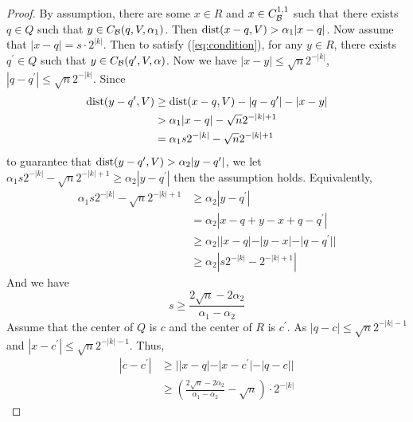 \begin{proof} 
    By assumption, there are some $x\in R$ and $x\in C_\mathcal B^{1, 1}$ such that there exists $q\in Q$ such that $y\in C_\mathcal B(q, V, \alpha_1)$. Then $\operatorname{dist}(x-q, V) > \alpha_1|x-q|$. Now assume that $|x-q| = s\cdot 2^{|k|}$. Then to satisfy (\ref{eq:condition}), for any $y\in R$, there exists $q^\prime\in Q$ such that $y\in C_\mathcal B(q^\prime, V, \alpha)$. Now we have $|x-y|\leq \sqrt{n}2^{-|k|}$, $|q-q^\prime|\leq \sqrt{n}2^{-|k|}$. Since
    \begin{equation*}
        \begin{split}
            \operatorname{dist}(y-q^\prime, V) &\geq \operatorname{dist}(x-q, V)-|q-q^\prime|-|x-y| \\
            &> \alpha_1|x-q| - \sqrt{n}2^{-|k|+1}\\
            &= \alpha_1 s 2^{-|k|} - \sqrt{n}2^{-|k|+1}
        \end{split}
    \end{equation*}
    to guarantee that $\operatorname{dist}(y-q^\prime, V) > \alpha_2|y-q^\prime|$, we let $\alpha_1 s 2^{-|k|} - \sqrt{n}2^{-|k|+1} \geq  \alpha_2|y-q^\prime|$ then the assumption holds. Equivalently,
    \begin{equation*}
        \begin{split}
            \alpha_1 s 2^{-|k|} - \sqrt{n}2^{-|k|+1} &\geq  \alpha_2|y-q^\prime| \\
            &= \alpha_2 |x-q+y-x+q-q^\prime| \\
            &\geq \alpha_2||x-q|-|y-x|-|q-q^\prime||\\
            &\geq \alpha_2|s2^{-|k|}-2^{-|k|+1}|
        \end{split}
    \end{equation*}
    And we have 
    $$s\geq \frac{2\sqrt{n} - 2\alpha_2}{\alpha_1-\alpha_2}$$
    Assume that the center of $Q$ is $c$ and the center of $R$ is $c^\prime$. As $|q-c|\leq \sqrt{n}2^{-|k|-1}$ and $|x-c^\prime| \leq \sqrt{n}2^{-|k|-1}$. Thus,
    \begin{equation*}
        \begin{split}
            |c-c^\prime| &\geq ||x-q|-|x-c^\prime|-|q-c||\\
            &\geq (\frac{2\sqrt{n} - 2\alpha_2}{\alpha_1-\alpha_2}-\sqrt{n})\cdot 2^{-|k|}
        \end{split}
    \end{equation*}
\end{proof}



